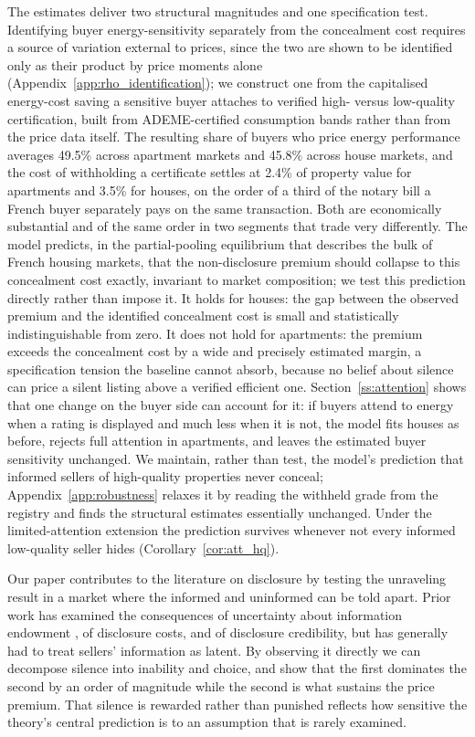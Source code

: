 The estimates deliver two structural magnitudes and one specification test. Identifying buyer
energy-sensitivity separately from the concealment cost requires a source of variation external
to prices, since the two are shown to be identified only as their product by price moments
alone (Appendix~\ref{app:rho_identification}); we construct one from the capitalised energy-cost
saving a sensitive buyer attaches to verified high- versus low-quality certification, built from
ADEME-certified consumption bands rather than from the price data itself. The resulting share of
buyers who price energy performance averages 49.5\% across apartment markets and 45.8\% across
house markets, and the cost of withholding a certificate settles at 2.4\% of property value for
apartments and 3.5\% for houses, on the order of a third of the notary bill a French buyer
separately pays on the same transaction. Both are economically substantial and of the
same order in two segments that trade very differently. The model predicts, in the partial-pooling
equilibrium that describes the bulk of French housing markets, that the non-disclosure premium
should collapse to this concealment cost exactly, invariant to market composition; we test this
prediction directly rather than impose it. It holds for houses: the gap between the observed
premium and the identified concealment cost is small and statistically indistinguishable from
zero. It does not hold for apartments: the premium exceeds the concealment cost by a wide and
precisely estimated margin, a specification tension the baseline cannot absorb, because no belief
about silence can price a silent listing above a verified efficient one.
Section~\ref{ss:attention} shows that one change on the buyer side can account for it: if buyers attend
to energy when a rating is displayed and much less when it is not, the model fits houses as before,
rejects full attention in apartments, and leaves the estimated buyer sensitivity unchanged.
We maintain, rather than test, the model's prediction that informed sellers of high-quality
properties never conceal; Appendix~\ref{app:robustness} relaxes it by reading the withheld grade
from the registry and finds the structural estimates essentially unchanged. Under the limited-attention
extension the prediction survives whenever not every informed low-quality seller hides (Corollary~\ref{cor:att_hq}).

Our paper contributes to the literature on disclosure by testing the unraveling result in a
market where the informed and uninformed can be told apart. Prior work has examined the
consequences of uncertainty about information endowment \citep{dye_disclosure_1985,
jung_kwon_1988}, of disclosure costs, and of disclosure credibility, but has generally had to
treat sellers' information as latent. By observing it directly we can decompose silence into
inability and choice, and show that the first dominates the second by an order of magnitude
while the second is what sustains the price premium. That silence is rewarded rather
than punished reflects how sensitive the theory's central prediction is to an assumption that
is rarely examined.

